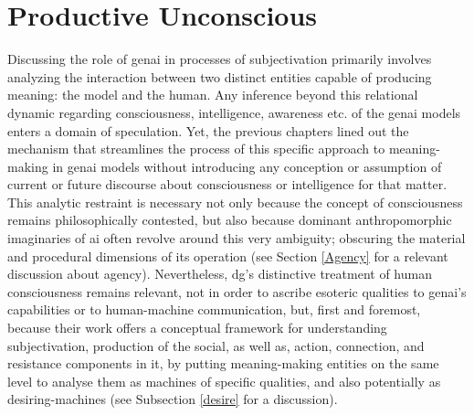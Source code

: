 \section{Productive Unconscious}

%
%

Discussing the role of \gls{genai} in processes of subjectivation primarily involves analyzing the interaction between two distinct entities capable of producing meaning: the model and the human. Any inference beyond this relational dynamic regarding consciousness, intelligence, awareness etc. of the \gls{genai} models  enters a domain of speculation. Yet, the
previous chapters lined out the mechanism that streamlines the process of this
specific approach to meaning-making in \gls{genai} models without introducing
any conception or assumption of current or future discourse about
consciousness or intelligence for that matter. This analytic restraint is necessary not only because the concept of consciousness remains philosophically contested, but also because dominant anthropomorphic imaginaries of \gls{ai} often revolve around this very ambiguity; obscuring the material and procedural dimensions of its operation (see Section \ref{Agency} for a relevant discussion about agency).
Nevertheless, \gls{dg}'s  distinctive treatment of human consciousness remains relevant, not in order to ascribe esoteric qualities to \gls{genai}'s capabilities or to human-machine communication, but, first and foremost, because their work offers a conceptual framework for understanding subjectivation, production of the social, as well as, action, connection,  and resistance components in it, by putting meaning-making entities on the same level to analyse them as machines of specific qualities, and also potentially as desiring-machines (see Subsection \ref{desire} for a discussion).
%
%


